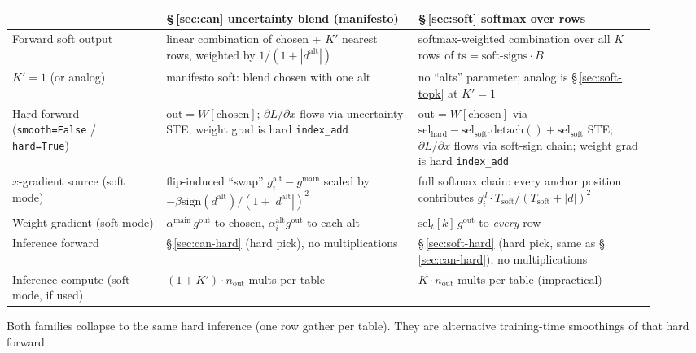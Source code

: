 \documentclass[11pt]{article}
\begin{document}
\begin{center}\small
\begin{tabular}{>{\raggedright\arraybackslash}p{0.22\linewidth} >{\raggedright\arraybackslash}p{0.36\linewidth} >{\raggedright\arraybackslash}p{0.34\linewidth}}
\toprule
 & \S\,\ref{sec:can} uncertainty blend (manifesto) & \S\,\ref{sec:soft} softmax over rows \\
\midrule
Forward soft output & linear combination of chosen + $K'$ nearest rows, weighted by $1/(1+|d^{\mathrm{alt}}|)$ & softmax-weighted combination over all $K$ rows of $\mathrm{ts}=\text{soft-signs}\cdot B$ \\
$K'{=}1$ (or analog) & manifesto soft: blend chosen with one alt & no ``alts'' parameter; analog is \S\,\ref{sec:soft-topk} at $K'{=}1$ \\
Hard forward (\texttt{smooth=False} / \texttt{hard=True}) & out${=}W[\mathrm{chosen}]$; $\partial L/\partial x$ flows via uncertainty STE; weight grad is hard \texttt{index\_add} & out${=}W[\mathrm{chosen}]$ via $\mathrm{sel}_{\mathrm{hard}}-\mathrm{sel}_{\mathrm{soft}}.\mathrm{detach}()+\mathrm{sel}_{\mathrm{soft}}$ STE; $\partial L/\partial x$ flows via soft-sign chain; weight grad is hard \texttt{index\_add} \\
$x$-gradient source (soft mode) & flip-induced ``swap'' $g^{\mathrm{alt}}_i - g^{\mathrm{main}}$ scaled by $-\beta\mathrm{sign}(d^{\mathrm{alt}})/(1+|d^{\mathrm{alt}}|)^2$ & full softmax chain: every anchor position contributes $g^{d}_i\cdot T_{\mathrm{soft}}/(T_{\mathrm{soft}}+|d|)^2$ \\
Weight gradient (soft mode) & $\alpha^{\mathrm{main}}\,g^{\mathrm{out}}$ to chosen, $\alpha^{\mathrm{alt}}_i g^{\mathrm{out}}$ to each alt & $\mathrm{sel}_t[k]\,g^{\mathrm{out}}$ to \emph{every} row \\
Inference forward & \S\,\ref{sec:can-hard} (hard pick), no multiplications & \S\,\ref{sec:soft-hard} (hard pick, same as \S\,\ref{sec:can-hard}), no multiplications \\
Inference compute (soft mode, if used) & $(1{+}K')\cdot n_{\mathrm{out}}$ mults per table & $K\cdot n_{\mathrm{out}}$ mults per table (impractical) \\
\bottomrule
\end{tabular}
\end{center}

Both families collapse to the same hard inference (one row gather per
table). They are alternative training-time smoothings of that hard forward.
\end{document}
